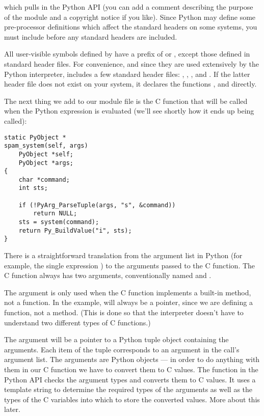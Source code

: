 which pulls in the Python API (you can add a comment describing the
purpose of the module and a copyright notice if you like).
Since Python may define some pre-processor definitions which affect
the standard headers on some systems, you must include 
before any standard headers are included.

All user-visible symbols defined by  have a prefix of
 or , except those defined in standard header files.
For convenience, and since they are used extensively by the Python
interpreter,  includes a few standard header files:
, , , and
.  If the latter header file does not exist on your
system, it declares the functions ,
 and  directly.

The next thing we add to our module file is the C function that will
be called when the Python expression 
is evaluated (we'll see shortly how it ends up being called):

\begin{verbatim}
static PyObject *
spam_system(self, args)
    PyObject *self;
    PyObject *args;
{
    char *command;
    int sts;

    if (!PyArg_ParseTuple(args, "s", &command))
        return NULL;
    sts = system(command);
    return Py_BuildValue("i", sts);
}
\end{verbatim}

There is a straightforward translation from the argument list in
Python (for example, the single expression ) to the
arguments passed to the C function.  The C function always has two
arguments, conventionally named  and .

The  argument is only used when the C function implements a
built-in method, not a function. In the example,  will
always be a \NULL{} pointer, since we are defining a function, not a
method.  (This is done so that the interpreter doesn't have to
understand two different types of C functions.)

The  argument will be a pointer to a Python tuple object
containing the arguments.  Each item of the tuple corresponds to an
argument in the call's argument list.  The arguments are Python
objects --- in order to do anything with them in our C function we have
to convert them to C values.  The function 
in the Python API checks the argument types and converts them to C
values.  It uses a template string to determine the required types of
the arguments as well as the types of the C variables into which to
store the converted values.  More about this later.

